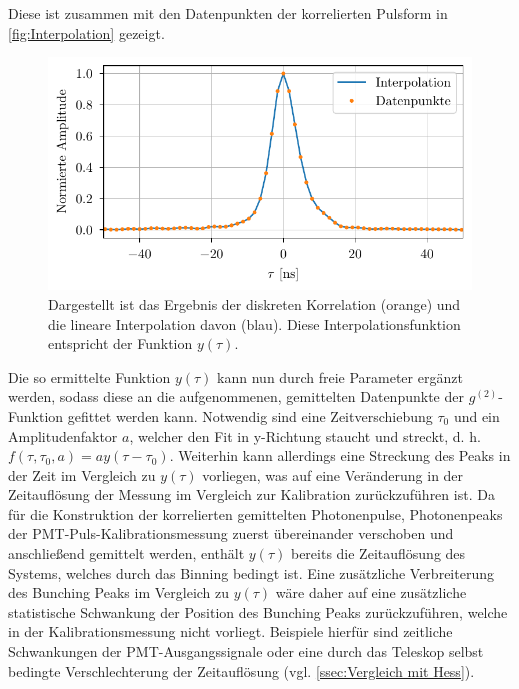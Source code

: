 Diese ist zusammen mit den Datenpunkten der korrelierten Pulsform in \autoref{fig:Interpolation} gezeigt. 
\begin{figure}[h]
    \centering
    \includegraphics{images/Analysis/interpolation.pdf}
    \caption{Dargestellt ist das Ergebnis der diskreten Korrelation (orange) und die lineare Interpolation davon (blau). Diese Interpolationsfunktion entspricht der Funktion $y(\tau)$.}
    \label{fig:Interpolation}
\end{figure}
Die so ermittelte Funktion $y(\tau)$ kann nun durch freie Parameter ergänzt werden, sodass diese an die aufgenommenen, gemittelten Datenpunkte der $g^{(2)}$-Funktion gefittet werden kann. 
Notwendig sind eine Zeitverschiebung $\tau_0$ und ein Amplitudenfaktor $a$, welcher den Fit in y-Richtung staucht und streckt, d. h. $f(\tau, \tau_0, a) = ay(\tau - \tau_0)$. 
Weiterhin kann allerdings eine Streckung des Peaks in der Zeit im Vergleich zu $y(\tau)$ vorliegen, was auf eine Veränderung in der Zeitauflösung der Messung im Vergleich zur Kalibration zurückzuführen ist. 
Da für die Konstruktion der korrelierten gemittelten Photonenpulse, Photonenpeaks der PMT-Puls-Kalibrationsmessung zuerst übereinander verschoben und anschließend gemittelt werden, enthält $y(\tau)$ bereits die Zeitauflösung des Systems, welches durch das Binning bedingt ist. 
Eine zusätzliche Verbreiterung des Bunching Peaks im Vergleich zu $y(\tau)$ wäre daher auf eine zusätzliche statistische Schwankung der Position des Bunching Peaks zurückzuführen, welche in der Kalibrationsmessung nicht vorliegt. 
Beispiele hierfür sind zeitliche Schwankungen der PMT-Ausgangssignale oder eine durch das Teleskop selbst bedingte Verschlechterung der Zeitauflösung (vgl. \autoref{ssec:Vergleich mit Hess}).

